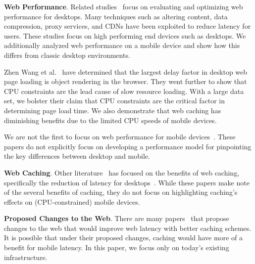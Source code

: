 \textbf{Web Performance}. Related studies~\cite{web-perf-2, web-perf-3} focus on evaluating and optimizing web performance for desktops. Many techniques such as altering content, data compression, proxy services, and CDNs have been exploited to reduce latency for users. These studies focus on high performing end devices such as desktops. We additionally analyzed web performance on a mobile device and show how this differs from classic desktop environments.

Zhen Wang et al.~\cite{CPU-plt-2, CPU-plt-3} have determined that the largest delay factor in desktop web page loading is object rendering in the browser. They went further to show that CPU constraints are the lead cause of slow resource loading.
With a large data set, we bolster their claim that CPU constraints are the critical factor in determining page load time. We also demonstrate that web caching has diminishing benefits due to the limited CPU speeds of mobile devices.

We are not the first to focus on web performance for mobile
devices~\cite{CPU-plt-2, CPU-plt-3}. These papers do not explicitly focus on
developing a performance
model for pinpointing the key differences between desktop
and mobile.

\textbf{Web Caching}. Other literature~\cite{web-caching-1, web-caching-2, web-caching-8, web-caching-9} has focused on the benefits of web caching, specifically the reduction of latency for desktops~\cite{web-caching-3, web-caching-4, web-caching-5, web-caching-6, web-caching-7}.
While these papers make note of the several benefits of caching, they do not
focus on highlighting caching's effects on (CPU-constrained) mobile devices.


\textbf{Proposed Changes to the Web}. There are many
papers~\cite{web-perf-4-new-design, web-caching-4-new-design,
web-caching-5-new-design, web-caching-latency-1-new-design,
web-caching-latency-2-new-design, web-caching-latency-3-new-design,
web-caching-latency-5-new-design, web-caching-latency-6-new-design,
web-caching-latency-7-new-design} that propose changes to the web that would
improve web latency with better caching schemes. It is possible that under their proposed changes, caching would have more of a benefit for mobile latency. In this paper, we focus only on today's existing infrastructure. %

